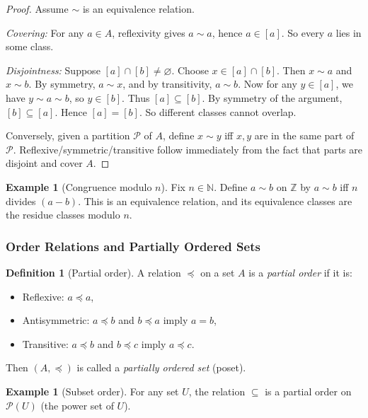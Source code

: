 \documentclass[12pt]{article}
\numberwithin{equation}{section}
\newcommand{\ZZ}{\mathbb{Z}}
\newcommand{\NN}{\mathbb{N}}
\let\emptyset\varnothing
\theoremstyle{plain}
\theoremstyle{definition}
\newtheorem{definition}[theorem]{Definition}
\newtheorem{example}[theorem]{Example}
\theoremstyle{remark}
\begin{document}
\begin{proof}
Assume $\sim$ is an equivalence relation.

\emph{Covering:} For any $a\in A$, reflexivity gives $a\sim a$, hence $a\in [a]$. So every $a$ lies in some class.

\emph{Disjointness:} Suppose $[a]\cap [b]\neq \emptyset$. Choose $x\in [a]\cap [b]$. Then $x\sim a$ and $x\sim b$.  
By symmetry, $a\sim x$, and by transitivity, $a\sim b$. Now for any $y\in [a]$, we have $y\sim a\sim b$, so $y\in [b]$. Thus $[a]\subseteq [b]$.  
By symmetry of the argument, $[b]\subseteq [a]$. Hence $[a]=[b]$. So different classes cannot overlap.

Conversely, given a partition $\mathcal{P}$ of $A$, define $x\sim y$ iff $x,y$ are in the same part of $\mathcal{P}$.  
Reflexive/symmetric/transitive follow immediately from the fact that parts are disjoint and cover $A$.
\end{proof}

\begin{example}[Congruence modulo $n$]
Fix $n\in\NN$. Define $a\sim b$ on $\ZZ$ by $a\sim b$ iff $n$ divides $(a-b)$.  
This is an equivalence relation, and its equivalence classes are the residue classes modulo $n$.
\end{example}

\subsubsection{Order Relations and Partially Ordered Sets}

\begin{definition}[Partial order]
A relation $\preceq$ on a set $A$ is a \emph{partial order} if it is:
\begin{itemize}
  \item Reflexive: $a\preceq a$,
  \item Antisymmetric: $a\preceq b$ and $b\preceq a$ imply $a=b$,
  \item Transitive: $a\preceq b$ and $b\preceq c$ imply $a\preceq c$.
\end{itemize}
Then $(A,\preceq)$ is called a \emph{partially ordered set} (poset).
\end{definition}

\begin{example}[Subset order]
For any set $U$, the relation $\subseteq$ is a partial order on $\mathcal{P}(U)$ (the power set of $U$).
\end{example}
\end{document}
